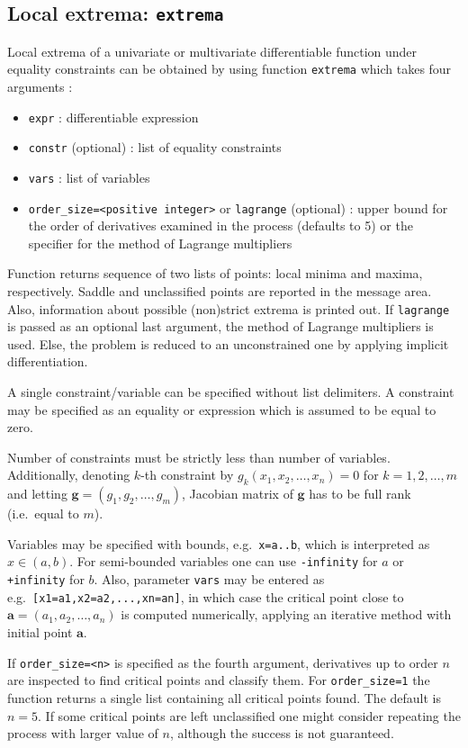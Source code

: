 \documentclass[a4paper,11pt]{book}
\begin{document}
\subsection{Local extrema: {\tt extrema}}

Local extrema of a univariate or multivariate differentiable function under equality constraints can be obtained by using function {\tt extrema} which takes four arguments :
\begin{itemize}
\item {\tt expr} : differentiable expression
\item {\tt constr} (optional) : list of equality constraints
\item {\tt vars} : list of variables
\item {\tt order\_size=<positive integer>} or {\tt lagrange} (optional) : upper bound for the order of derivatives examined in the process (defaults to 5) or the specifier for the method of Lagrange multipliers
\end{itemize}
Function returns sequence of two lists of points: local minima and maxima, respectively. Saddle and unclassified points are reported in the message area. Also, information about possible (non)strict extrema is printed out. If {\tt lagrange} is passed as an optional last argument, the method of Lagrange multipliers is used. Else, the problem is reduced to an unconstrained one by applying implicit differentiation.

A single constraint/variable can be specified without list delimiters. A constraint may be specified as an equality or expression which is assumed to be equal to zero.

Number of constraints must be strictly less than number of variables. Additionally, denoting $ k $-th constraint by $ g_k(x_1,x_2,\dots,x_n)=0 $ for $ k=1,2,\dots,m $ and letting $ \mathbf{g}=(g_1,g_2,\dots,g_m) $, Jacobian matrix of $ \mathbf{g} $ has to be full rank (i.e.~equal to $ m $).

Variables may be specified with bounds, e.g.~{\tt x=a..b}, which is interpreted as $ x\in(a,b) $. For semi-bounded variables one can use {\tt -infinity} for $ a $ or {\tt +infinity} for $ b $. Also, parameter {\tt vars} may be entered as e.g.~{\tt [x1=a1,x2=a2,...,xn=an]}, in which case the critical point close to $ \mathbf{a}=(a_1,a_2,\dots,a_n) $ is computed numerically, applying an iterative method with initial point $ \mathbf{a} $.

If {\tt order\_size=<n>} is specified as the fourth argument, derivatives up to order $ n $ are inspected to find critical points and classify them. For {\tt order\_size=1} the function returns a single list containing all critical points found. The default is $ n=5 $. If some critical points are left unclassified one might consider repeating the process with larger value of $ n $, although the success is not guaranteed.
\end{document}
